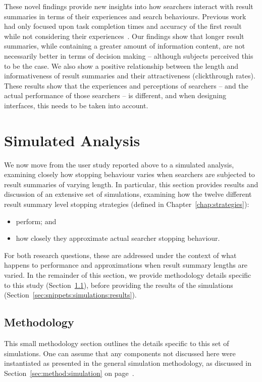These novel findings provide new insights into how searchers interact with result summaries in terms of their experiences and search behaviours. Previous work had only focused upon task completion times and accuracy of the first result while not considering their experiences~\citep{cutrell2007eye_tracking, kaisser2008improving}. Our findings show that longer result summaries, while containing a greater amount of information content, are not necessarily better in terms of decision making -- although subjects perceived this to be the case. We also show a positive relationship between the length and informativeness of result summaries and their attractiveness (clickthrough rates). These results show that the experiences and perceptions of searchers -- and the actual performance of those searchers -- is different, and when designing interfaces, this needs to be taken into account.

\section{Simulated Analysis}\label{sec:snippets:simulations}
We now move from the user study reported above to a simulated analysis, examining closely how stopping behaviour varies when searchers are subjected to result summaries of varying length. In particular, this section provides results and discussion of an extensive set of simulations, examining how the twelve different result summary level stopping strategies (defined in Chapter~\ref{chap:strategies}):

\begin{itemize}
    \item{ perform; and}
    \item{ how closely they approximate actual searcher stopping behaviour.}
\end{itemize}

For both research questions, these are addressed under the context of what happens to performance and approximations when result summary lengths are varied. In the remainder of this section, we provide methodology details specific to this study (Section~\ref{sec:snippets:simulations:method}), before providing the results of the simulations (Section~\ref{sec:snippets:simulations:results}).

\subsection{Methodology}\label{sec:snippets:simulations:method}
This small methodology section outlines the details specific to this set of simulations. One can assume that any components not discussed here were instantiated as presented in the general simulation methodology, as discussed in Section~\ref{sec:method:simulation} on page~\pageref{sec:method:simulation}.

